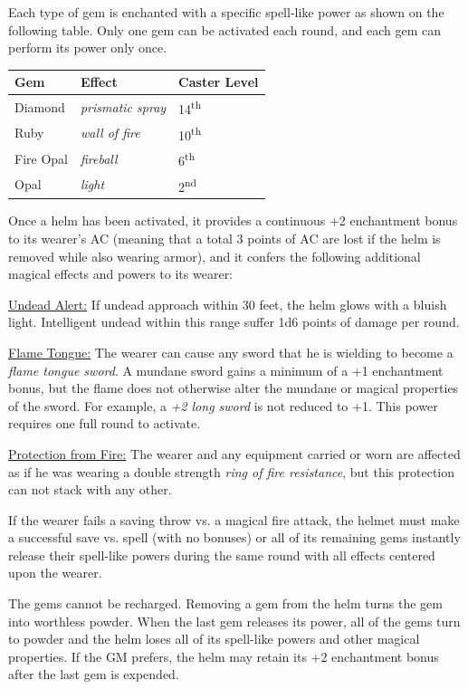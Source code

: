 \begin{multicols}{2}
Each type of gem is enchanted with a specific spell-like power as shown on the following table.  Only one gem can be activated each round, and each gem can perform its power only once. 

\noindent
\begin{tabular}{|p{}|p{}|p{}|}
\hline
Gem	& Effect	& Caster Level \\
\hline\hline
\rowcolor[gray]{.9}Diamond	& \textit{prismatic spray} 	& 14\textsuperscript{th} \\
Ruby	& \textit{wall of fire}	& 10\textsuperscript{th} \\
\rowcolor[gray]{.9}Fire Opal	& \textit{fireball}	& 6\textsuperscript{th} \\
Opal	& \textit{light}	& 2\textsuperscript{nd}  \\
\hline
\end{tabular}

Once a helm has been activated, it provides a continuous +2 enchantment bonus to its wearer's AC (meaning that a total 3 points of AC are lost if the helm is removed while also wearing armor), and it confers the following additional magical effects and powers to its wearer:

\underline{Undead Alert:} If undead approach within 30 feet, the helm glows with a bluish light.  Intelligent undead within this range suffer 1d6 points of damage per round.

\underline{Flame Tongue:} The wearer can cause any sword that he is wielding to become a \textit{flame tongue sword}.  A mundane sword gains a minimum of a +1 enchantment bonus, but the flame does not otherwise alter the mundane or magical properties of the sword.  For example, a \textit{+2 long sword} is not reduced to +1.  This power requires one full round to activate.

\underline{Protection from Fire:} The wearer and any equipment carried or worn are affected as if he was wearing a double strength \textit{ring of fire resistance}, but this protection can not stack with any other.

If the wearer fails a saving throw vs. a magical fire attack, the helmet must make a successful save vs. spell (with no bonuses) or all of its remaining gems instantly release their spell-like powers during the same round with all effects centered upon the wearer.

The gems cannot be recharged.  Removing a gem from the helm turns the gem into worthless powder.  When the last gem releases its power, all of the gems turn to powder and the helm loses all of its spell-like powers and other magical properties.  If the GM prefers, the helm may retain its +2 enchantment bonus after the last gem is expended.
 

\end{multicols}
